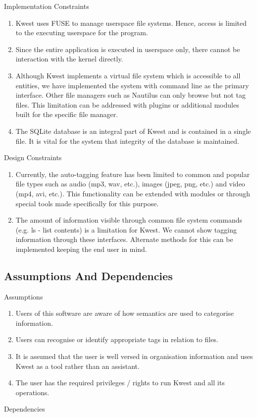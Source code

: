 Implementation Constraints
\begin{enumerate}
\item Kwest uses FUSE to manage userspace file systems. Hence, access is limited to the
executing userspace for the program.
 \item Since the entire application is executed in userspace only, there cannot be interaction
with the kernel directly.
\item Although Kwest implements a virtual file system which is accessible to all entities,
we have implemented the system with command line as the primary interface. Other
file managers such as Nautilus can only browse but not tag files. This limitation can
be addressed with plugins or additional modules built for the specific file manager.
\item The SQLite database is an integral part of Kwest and is contained in a single file. It
is vital for the system that integrity of the database is maintained.
\end{enumerate}
Design Constraints

\begin{enumerate}

\item Currently, the auto-tagging feature has been limited to common and popular file
types such as audio (mp3, wav, etc.), images (jpeg, png, etc.) and video (mp4, avi,
etc.). This functionality can be extended with modules or through special tools
made specifically for this purpose.

\item The amount of information visible through common file system commands (e.g.
ls - list contents) is a limitation for Kwest. We cannot show tagging information
through these interfaces. Alternate methods for this can be implemented keeping
the end user in mind.
\end{enumerate}


\subsection{ Assumptions And Dependencies}

Assumptions
\begin{enumerate}
\item Users of this software are aware of how semantics are used to categorise
information.
\item Users can recognise or identify appropriate tags in relation to files.
\item It is assumed that the user is well versed in organisation information and uses Kwest
as a tool rather than an assistant.
\item The user has the required privileges / rights to run Kwest and all its operations.
\end{enumerate}
Dependencies

